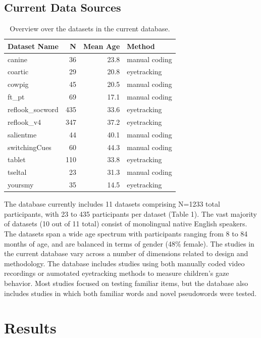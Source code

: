 \documentclass[10pt, letterpaper]{article}
\begin{document}
\hypertarget{current-data-sources}{%
\subsection{Current Data Sources}\label{current-data-sources}}

\begin{table}[H]
\centering
\begingroup\fontsize{9pt}{10pt}\selectfont
\begin{tabular}{lrrl}
  \hline
Dataset Name & N & Mean Age & Method \\ 
  \hline
canine & 36 & 23.8 & manual coding \\ 
  coartic & 29 & 20.8 & eyetracking \\ 
  cowpig & 45 & 20.5 & manual coding \\ 
  ft\_pt & 69 & 17.1 & manual coding \\ 
  reflook\_socword & 435 & 33.6 & eyetracking \\ 
  reflook\_v4 & 347 & 37.2 & eyetracking \\ 
  salientme & 44 & 40.1 & manual coding \\ 
  switchingCues & 60 & 44.3 & manual coding \\ 
  tablet & 110 & 33.8 & eyetracking \\ 
  tseltal & 23 & 31.3 & manual coding \\ 
  yoursmy & 35 & 14.5 & eyetracking \\ 
   \hline
\end{tabular}
\endgroup
\caption{Overview over the datasets in the current database.} 
\end{table}

The database currently includes 11 datasets comprising N=1233 total
participants, with 23 to 435 participants per dataset (Table 1). The
vast majority of datasets (10 out of 11 total) consist of monolingual
native English speakers.\\
The datasets span a wide age spectrum with participants ranging from 8
to 84 months of age, and are balanced in terms of gender (48\% female).
The studies in the current database vary across a number of dimensions
related to design and methodology. The database includes studies using
both manually coded video recordings or aumotated eyetracking methods to
measure children's gaze behavior. Most studies focused on testing
familiar items, but the database also includes studies in which both
familiar words and novel pseudowords were tested.

\hypertarget{results}{%
\section{Results}\label{results}}
\end{document}
